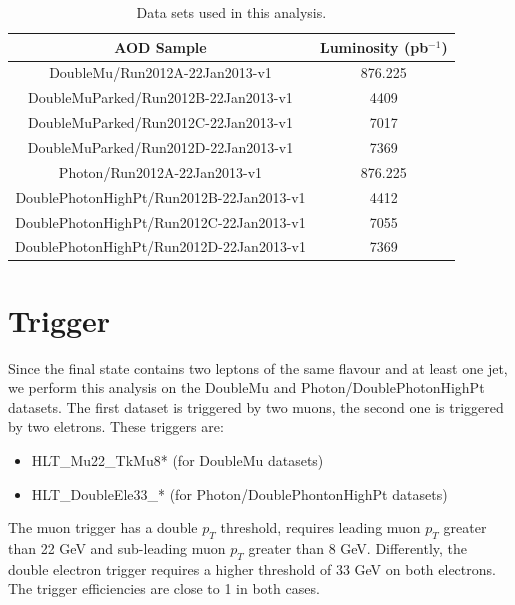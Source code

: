 \begin{center}
  \begin{table}[h]
    \begin{center}
      \begin{tabular}{|c|c|}
        \hline
        AOD Sample & Luminosity (pb$^{-1}$) \\ \hline
        DoubleMu/Run2012A-22Jan2013-v1 & 876.225 \\ \hline
        DoubleMuParked/Run2012B-22Jan2013-v1 & 4409 \\ \hline
        DoubleMuParked/Run2012C-22Jan2013-v1 & 7017 \\ \hline
        DoubleMuParked/Run2012D-22Jan2013-v1 & 7369 \\ \hline
        Photon/Run2012A-22Jan2013-v1 &  876.225 \\ \hline
        DoublePhotonHighPt/Run2012B-22Jan2013-v1 & 4412 \\ \hline
        DoublePhotonHighPt/Run2012C-22Jan2013-v1 & 7055 \\ \hline
        DoublePhotonHighPt/Run2012D-22Jan2013-v1 & 7369 \\
        \hline
      \end{tabular}
    \end{center}
    \caption{\label{tab:TabDataSet}Data sets used in this analysis.}    
  \end{table}
\end{center}

\section{Trigger}
Since the final state contains two leptons of the same flavour and at least one jet, we perform this analysis on the DoubleMu and Photon/DoublePhotonHighPt datasets. The first dataset is triggered by two muons, the second one is triggered by two eletrons. These triggers are:
\begin{itemize}
\item HLT\_Mu22\_TkMu8* (for DoubleMu datasets)
\item HLT\_DoubleEle33\_* (for Photon/DoublePhontonHighPt datasets)
\end{itemize}

The muon trigger has a double $p_{T}$ threshold, requires leading muon $p_{T}$ greater than 22 GeV and sub-leading muon $p_{T}$ greater than 8 GeV. Differently, the double electron trigger requires a higher threshold of 33 GeV on both electrons. The trigger efficiencies are close to 1 in both cases.

